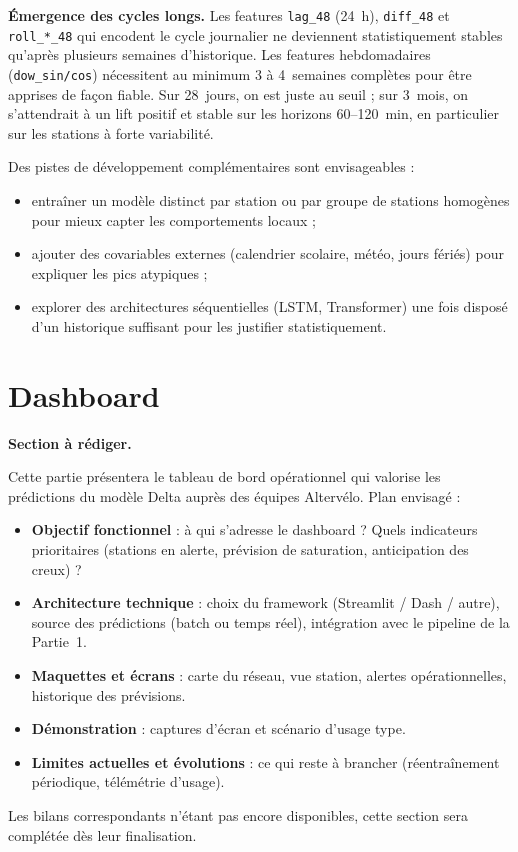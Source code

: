 \documentclass[fleqn, 12pt]{scrartcl}
\newcommand{\ent}{Altervélo\xspace}
\newcommand{\todoSection}[1]{%
\vspace{.3cm}
\begin{tcolorbox}[colback=red!5!white,colframe=red!60!black,title=\textbf{À compléter}]%
#1
\end{tcolorbox}%
\vspace{.3cm}
}
\begin{document}
\textbf{Émergence des cycles longs.} Les features \texttt{lag\_48} (24~h), \texttt{diff\_48} et \texttt{roll\_*\_48} qui encodent le cycle journalier ne deviennent statistiquement stables qu'après plusieurs semaines d'historique. Les features hebdomadaires (\texttt{dow\_sin/cos}) nécessitent au minimum 3 à 4~semaines complètes pour être apprises de façon fiable. Sur 28~jours, on est juste au seuil ; sur 3~mois, on s'attendrait à un lift positif et stable sur les horizons 60--120~min, en particulier sur les stations à forte variabilité.

\vspace{0.3cm}

Des pistes de développement complémentaires sont envisageables :
\begin{itemize}
    \item entraîner un modèle distinct par station ou par groupe de stations homogènes pour mieux capter les comportements locaux ;
    \item ajouter des covariables externes (calendrier scolaire, météo, jours fériés) pour expliquer les pics atypiques ;
    \item explorer des architectures séquentielles (LSTM, Transformer) une fois disposé d'un historique suffisant pour les justifier statistiquement.
\end{itemize}


\newpage

\section{Dashboard}
\label{sec:dashboard}

\todoSection{%
\textbf{Section à rédiger.}

Cette partie présentera le tableau de bord opérationnel qui valorise les prédictions du modèle Delta auprès des équipes \ent. Plan envisagé :

\begin{itemize}
    \item \textbf{Objectif fonctionnel} : à qui s'adresse le dashboard ? Quels indicateurs prioritaires (stations en alerte, prévision de saturation, anticipation des creux) ?
    \item \textbf{Architecture technique} : choix du framework (Streamlit / Dash / autre), source des prédictions (batch ou temps réel), intégration avec le pipeline de la Partie~1.
    \item \textbf{Maquettes et écrans} : carte du réseau, vue station, alertes opérationnelles, historique des prévisions.
    \item \textbf{Démonstration} : captures d'écran et scénario d'usage type.
    \item \textbf{Limites actuelles et évolutions} : ce qui reste à brancher (réentraînement périodique, télémétrie d'usage).
\end{itemize}

Les bilans correspondants n'étant pas encore disponibles, cette section sera complétée dès leur finalisation.
}
\end{document}
